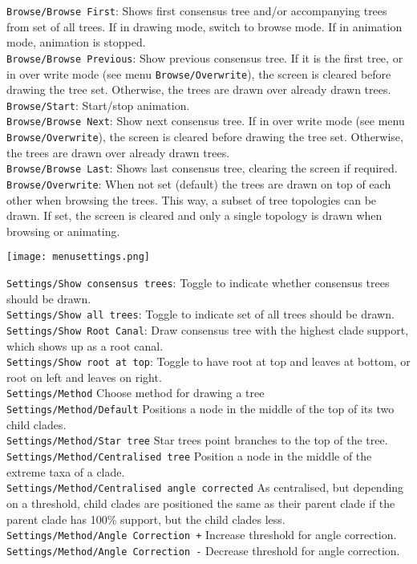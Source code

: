 \documentclass{article}
\begin{document}
\noindent
{\tt Browse/Browse First}: Shows first consensus tree and/or accompanying trees from set of
all trees. If in drawing mode, switch to browse mode. If in animation mode, animation is
stopped.\\
{\tt Browse/Browse Previous}: Show previous consensus tree. If it is the first tree,
or in over write mode (see menu {\tt Browse/Overwrite}), the screen is cleared before
drawing the tree set. Otherwise, the trees are drawn over already drawn trees.\\
{\tt Browse/Start}: Start/stop animation.\\
{\tt Browse/Browse Next}: Show next consensus tree. If in over write mode 
(see menu {\tt Browse/Overwrite}), the screen is cleared before drawing the tree set.
Otherwise, the trees are drawn over already drawn trees.\\
{\tt Browse/Browse Last}: Shows last consensus tree, clearing the screen if required.\\
{\tt Browse/Overwrite}: When not set (default) the trees are drawn on top of each other
when browsing the trees. This way, a subset of tree topologies can be drawn. 
If set, the screen is cleared and only a single topology is drawn when browsing or
animating.\\


\begin{center}
\texttt{[image: menusettings.png]}
\end{center}

\noindent
{\tt Settings/Show consensus trees}: Toggle to indicate whether consensus trees 
should be drawn.\\
{\tt Settings/Show all trees}: Toggle to indicate set of all trees should be drawn.\\
{\tt Settings/Show Root Canal}: Draw consensus tree with the highest clade support, which shows
up as a root canal.\\
{\tt Settings/Show root at top}: Toggle to have root at top and leaves at bottom, or
root on left and leaves on right.\\
%

\noindent
{\tt Settings/Method} Choose method for drawing a tree\\
{\tt Settings/Method/Default} Positions a node in the middle of the top of its two child clades.\\
{\tt Settings/Method/Star tree} Star trees point branches to the top of the tree.\\
{\tt Settings/Method/Centralised tree} Position a node in the middle of the extreme taxa of a clade.\\
{\tt Settings/Method/Centralised angle corrected} As centralised, but depending on a threshold, child clades
are positioned the same as their parent clade if the parent clade has 100\% support, but the child clades
less.\\
{\tt Settings/Method/Angle Correction +} Increase threshold for angle correction.\\
{\tt Settings/Method/Angle Correction -} Decrease threshold for angle correction.\\
\end{document}
